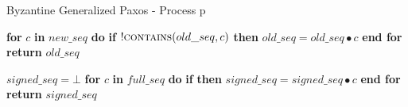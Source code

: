 \begin{algorithm}
	\caption{Byzantine Generalized Paxos - Process p}
	\begin{algorithmic}[1]
		
		\State \textbf{for} $c$ \textbf{in} $new\_seq$ \textbf{do} 
		\State \hspace{\algorithmicindent} \textbf{if} $!\Call{contains}{old\_seq,c}$ \textbf{then}
		\State \hspace{\algorithmicindent}\hspace{\algorithmicindent}\hspace{\algorithmicindent} $old\_seq =  old\_seq \bullet c$
		\State \textbf{end for}
		\State \textbf{return} $old\_seq$
		\EndFunction
		
		\State
		\State $signed\_seq = \bot$
		\State \textbf{for} $c$ \textbf{in} $full\_seq$ \textbf{do}
		\State \hspace{\algorithmicindent} \textbf{if}  \textbf{then}
		\State \hspace{\algorithmicindent}\hspace{\algorithmicindent} $signed\_seq = signed\_seq \bullet c$
		\State \textbf{end for}
		\State \textbf{return} $signed\_seq$
		\EndFunction
	\end{algorithmic}
\end{algorithm}

